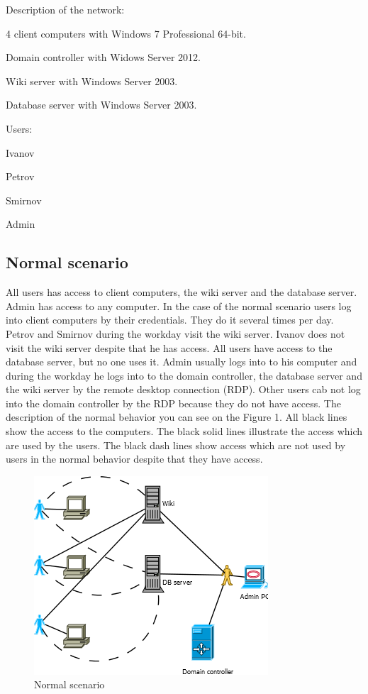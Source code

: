Description of the network:
\begin{compactitem}
\item 4 client computers with Windows 7 Professional 64-bit.
\item Domain controller with Widows Server 2012.
\item Wiki server with Windows Server 2003.
\item Database server with Windows Server 2003.
\end{compactitem}
Users: 
\begin{compactitem}
\item Ivanov
\item Petrov
\item Smirnov
\item Admin
\end{compactitem}
     
\subsection{Normal scenario}
All users has access to client computers, the wiki server and the database server. Admin has access to any computer. In the case of the normal scenario users log into client computers by their credentials. They do it several times per day. Petrov and Smirnov during the workday visit the wiki server. Ivanov does not visit the wiki server despite that he has access. All users have access to the database server, but no one uses it. Admin usually logs into to his computer and during the workday he logs into to the domain controller, the database server and the wiki server by the remote desktop connection (RDP). Other users cab not log into the domain controller by the RDP because they do not have access. The description of the normal behavior you can see on the Figure 1. All black lines show the access to the computers. The black solid lines illustrate the access which are used by the users. The black dash lines show access which are not used by users in the normal behavior despite that they have access. 
\begin{figure}[ht!]
\centering
\includegraphics{scenario_normal.png}
\caption{Normal scenario}
\label{overflow}
\end{figure}

